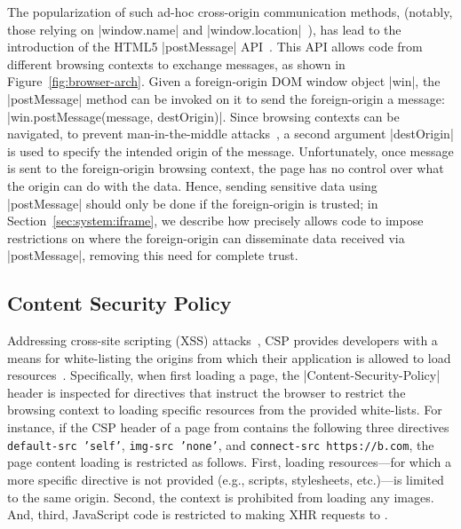 The popularization of such ad-hoc cross-origin communication methods,
(notably, those relying on \js|window.name| and
\js|window.location|~\cite{thidpartyjs}), has lead to the
introduction of the HTML5 \js|postMessage| API~\cite{webmessaging}.
%
This API allows code from different browsing contexts to exchange
messages, as shown in Figure~\ref{fig:browser-arch}.
%
Given a foreign-origin DOM window object \js|win|, the
\js|postMessage| method can be invoked on it to send the
foreign-origin a message: \js|win.postMessage(message, destOrigin)|.
%
Since browsing contexts can be navigated, to prevent man-in-the-middle
attacks~\cite{barth2009securing}, a second argument
\js|destOrigin| is used to specify the intended origin of the message.
%
Unfortunately, once message is sent to the foreign-origin browsing
context, the page has no control over what the origin can do with the
data.
%
Hence, sending sensitive data using \js|postMessage| should only be
done if the foreign-origin is trusted;
%
in Section~\ref{sec:system:iframe}, we describe how \sys{} precisely
allows code to impose restrictions on where the foreign-origin can
disseminate data received via \js|postMessage|, removing this need for
complete trust.

\subsection{Content Security Policy} 
\label{sec:background:csp}

Addressing cross-site scripting (XSS) attacks~\cite{kerschbaum2007simple}, CSP
provides developers with a means for white-listing the origins from which their
application is allowed to load resources~\cite{csp}.
%
Specifically, when first loading a page, the
\js|Content-Security-Policy| header is inspected for directives that
instruct the browser to restrict the browsing context to loading
specific resources from the provided white-lists.
%
For instance, if the CSP header of a page from  contains
the following three directives
%
\texttt{default-src 'self'}, \texttt{img-src 'none'}, and
\texttt{connect-src https://b.com},
%
the page content loading is restricted as follows.
%
First, loading resources---for which a more specific directive is not
provided (e.g., scripts, stylesheets, etc.)---is limited to the same
origin.
%
Second, the context is prohibited from loading any images.
%
And, third, JavaScript code is restricted to making XHR requests to
.

